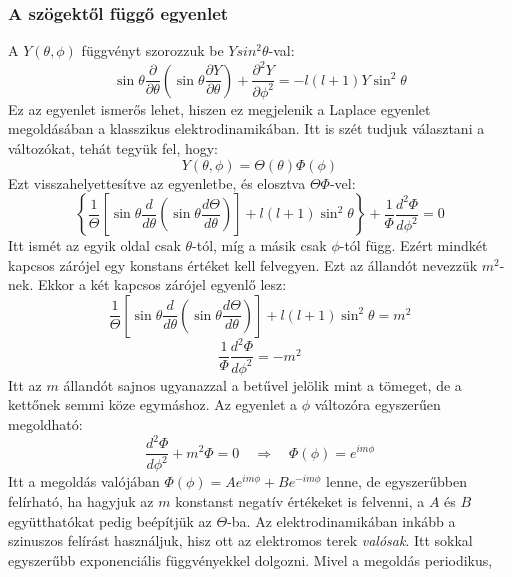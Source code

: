\documentclass[../main.tex]{subfiles}
\begin{document}
\subsubsection{A szögektől függő egyenlet}
A $Y(\theta,\phi)$ függvényt szorozzuk be $Y sin^2 \theta$-val:
\begin{equation}
    \sin \theta \frac{\partial}{\partial \theta} \left( \sin \theta \frac{\partial Y}{\partial \theta} \right) + \frac{\partial^2 Y}{\partial \phi^2} = -l (l+1) Y \sin^2 \theta
\end{equation}
Ez az egyenlet ismerős lehet, hiszen ez megjelenik a Laplace egyenlet megoldásában a klasszikus elektrodinamikában. Itt is szét tudjuk választani a változókat, tehát tegyük fel, hogy:
\begin{equation}
    Y(\theta,\phi) = \Theta(\theta) \Phi(\phi)
\end{equation}
Ezt visszahelyettesítve az egyenletbe, és elosztva $\Theta \Phi$-vel:
\begin{equation}
    \left\{ \frac{1}{\Theta} \left[\sin \theta \frac{d}{d \theta} \left( \sin \theta \frac{d \Theta}{d \theta} \right)\right] + l (l + 1) \sin^2 \theta \right\} + \frac{1}{\Phi} \frac{d^2 \Phi}{d \phi^2} = 0
\end{equation}
Itt ismét az egyik oldal csak $\theta$-tól, míg a másik csak $\phi$-tól függ. Ezért mindkét kapcsos zárójel egy konstans értéket kell felvegyen. Ezt az állandót nevezzük $m^2$-nek. Ekkor a két kapcsos zárójel egyenlő lesz:
\begin{equation}
    \frac{1}{\Theta} \left[\sin \theta \frac{d}{d \theta} \left( \sin \theta \frac{d \Theta}{d \theta} \right)\right] + l (l + 1) \sin^2 \theta = m^2
\end{equation}
\begin{equation}
    \frac{1}{\Phi} \frac{d^2 \Phi}{d \phi^2} = -m^2
\end{equation}
Itt az $m$ állandót sajnos ugyanazzal a betűvel jelölik mint a tömeget, de a kettőnek semmi köze egymáshoz. Az egyenlet a $\phi$ változóra egyszerűen megoldható:
\begin{equation}
    \frac{d^2 \Phi}{d \phi^2} + m^2 \Phi = 0 \quad \Rightarrow \quad \Phi(\phi) = e^{i m \phi}
\end{equation}
Itt a megoldás valójában $\Phi(\phi) = A e^{i m \phi} + B e^{-i m \phi}$ lenne, de egyszerűbben felírható, ha hagyjuk az $m$ konstanst negatív értékeket is felvenni, a $A$ és $B$ együtthatókat pedig beépítjük az $\Theta$-ba. Az elektrodinamikában inkább a szinuszos felírást használjuk, hisz ott az elektromos terek \textit{valósak}. Itt sokkal egyszerűbb exponenciális függvényekkel dolgozni. Mivel a megoldás periodikus,
\end{document}
